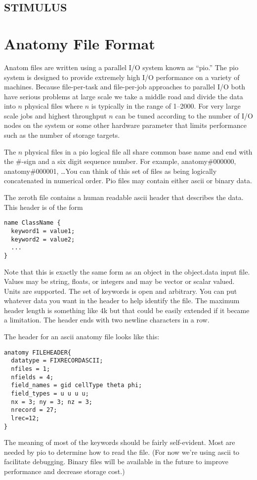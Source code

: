 \documentclass{article}
\begin{document}
\subsection{STIMULUS}

\section{Anatomy File Format}

Anatom files are written using a parallel I/O system known as ``pio.''
The pio system is designed to provide extremely high I/O performance on
a variety of machines.  Because file-per-task and file-per-job
approaches to parallel I/O both have serious problems at large scale we
take a middle road and divide the data into $n$ physical files where $n$
is typically in the range of 1--2000.  For very large scale jobs and
highest throughput $n$ can be tuned according to the number of I/O nodes
on the system or some other hardware parameter that limits performance
such as the number of storage targets.


The $n$ physical files in a pio logical file all share common base name
and end with the \#-sign and a six digit sequence number.  For example,
anatomy\#000000, anatomy\#000001, \ldots You can think of this set of
files as being logically concatenated in numerical order.  Pio files may
contain either ascii or binary data.

The zeroth file contains a human readable ascii header that describes
the data.  This header is of the form
\begin{verbatim}
name ClassName { 
  keyword1 = value1; 
  keyword2 = value2;
  ...
}
\end{verbatim}
Note that this is exactly the same form as an object in the object.data
input file.  Values may be string, floats, or integers and may be vector
or scalar valued.  Units are supported.  The set of keywords is open and
arbitrary.  You can put whatever data you want in the header to help
identify the file.  The maximum header length is something like 4k but
that could be easily extended if it became a limitation.  The header
ends with two newline characters in a row.

The header for an ascii anatomy file looks like this:
\begin{verbatim}
anatomy FILEHEADER{
  datatype = FIXRECORDASCII;
  nfiles = 1;
  nfields = 4;
  field_names = gid cellType theta phi;
  field_types = u u u u;
  nx = 3; ny = 3; nz = 3;
  nrecord = 27;
  lrec=12;
}
\end{verbatim}
The meaning of most of the keywords should be fairly self-evident.  Most
are needed by pio to determine how to read the file.   (For now we're
using ascii to facilitate debugging.  Binary files will be available in
the future to improve performance and decrease storage cost.)
\end{document}
